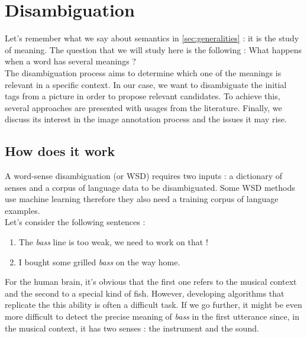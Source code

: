 
\chapter{Disambiguation} %

\label{chapter:Disambiguation} %


Let's remember what we say about semantics in \ref{sec:generalities} : it is the study of meaning. The question that we will study here is the following : What happens when a word has several meanings ?\\

The disambiguation process aims to determine which one of the meanings is relevant in a specific context. In our case, we want to disambiguate the initial tags from a picture in order to propose relevant candidates. To achieve this, several approaches are presented with usages from the literature. Finally, we discuss its interest in the image annotation process and the issues it may rise. 

\section{How does it work} %
\label{sec:how_does_it_work}
A word-sense disambiguation (or WSD) requires two inputs : a dictionary of senses and a corpus of language data to be disambiguated. Some WSD methods use machine learning therefore they also need a training corpus of language examples.\\
Let's consider the following sentences :
\begin{enumerate}
	\item The \textit{bass} line is too weak, we need to work on that !
	\item I bought some grilled \textit{bass} on the way home.
\end{enumerate}
For the human brain, it's obvious that the first one refers to the musical context and the second to a special kind of fish. However, developing algorithms that replicate the this ability is often a difficult task. If we go further, it might be even more difficult to detect the precise meaning of \textit{bass} in the first utterance since, in the musical context, it has two senses : the instrument and the sound.\\

